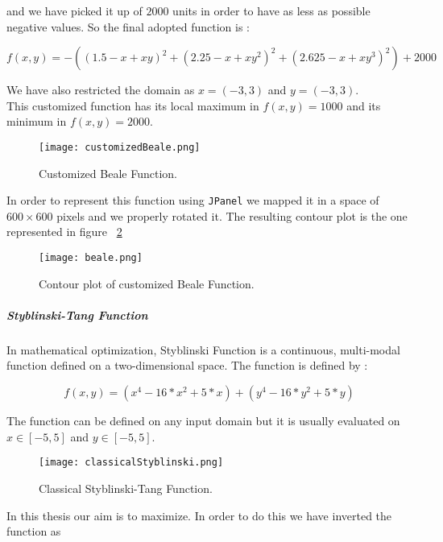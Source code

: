 and we have picked it up of $2000$ units in order to have as less as possible negative values. So the final adopted function is :

\begin{equation}
f(x, y) = -((1.5 - x + xy)^2 + (2.25 - x + xy^2)^2 + (2.625 - x + xy^3)^2) + 2000
\end{equation}

We have also restricted the domain as $x = (-3, 3)$ and $y = (-3, 3)$. \\

This customized function has its local maximum in $f(x, y) = 1000$ and its minimum in $f(x, y) = 2000$.

\begin{figure}[h!]
	\centering
	\texttt{[image: customizedBeale.png]}
	\caption{Customized Beale Function.}
	\label{fig:CustomizedBealeFunction}
\end{figure}

In order to represent this function using {\tt JPanel} we mapped it in a space of $600 \times 600$ pixels and we properly rotated it. The resulting contour plot is the one represented in figure ~\ref{fig:ContourPlotCustomizedBealeFunction} 

\begin{figure}[h!]
	\centering
	\texttt{[image: beale.png]}
	\caption{Contour plot of customized Beale Function.}
	\label{fig:ContourPlotCustomizedBealeFunction}
\end{figure}

\subparagraph{Styblinski-Tang Function} In mathematical optimization, Styblinski Function is a continuous, multi-modal function defined on a two-dimensional space. The function is defined by :

\begin{equation}
	f(x, y) = (x^4 - 16 * x^2 + 5 * x) + (y^4 - 16 * y^2 + 5 * y)
\end{equation}

The function can be defined on any input domain but it is usually evaluated on $x \in [-5, 5]$ and $y \in [-5, 5]$.

\begin{figure}[h!]
	\centering
	\texttt{[image: classicalStyblinski.png]}
	\caption{Classical Styblinski-Tang Function.}
	\label{fig:ClassicalStyblinskiFunction}
\end{figure}

In this thesis our aim is to maximize. In order to do this we have inverted the function as

